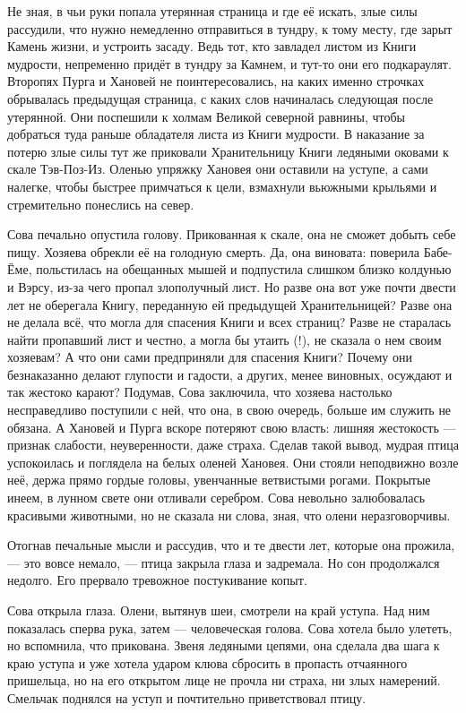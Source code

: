 \documentclass[12pt, a4paper, openany]{book}
\begin{document}
	Не зная, в чьи руки попала утерянная страница и где её искать, злые силы рассудили, что нужно немедленно отправиться в тундру, к тому месту, где зарыт Камень жизни, и устроить засаду. Ведь тот, кто завладел листом из Книги мудрости, непременно придёт в тундру за Камнем, и тут-то они его подкараулят. Второпях Пурга и Хановей не поинтересовались, на каких именно строчках обрывалась предыдущая страница, с каких слов начиналась следующая после утерянной. Они поспешили к холмам Великой северной равнины, чтобы добраться туда раньше обладателя листа из Книги мудрости. В наказание за потерю злые силы тут же приковали Хранительницу Книги ледяными оковами к скале Тэв-Поз-Из. Оленью упряжку Хановея они оставили на уступе, а сами налегке, чтобы быстрее примчаться к цели, взмахнули вьюжными крыльями и стремительно понеслись на север.
	
	Сова печально опустила голову. Прикованная к скале, она не сможет добыть себе пищу. Хозяева обрекли её на голодную смерть. Да, она виновата: поверила Бабе-Ёме, польстилась на обещанных мышей и подпустила слишком близко колдунью и Вэрсу, из-за чего пропал злополучный лист. Но разве она вот уже почти двести лет не оберегала Книгу, переданную ей предыдущей Хранительницей? Разве она не делала всё, что могла для спасения Книги и всех страниц? Разве не старалась найти пропавший лист и честно, а могла бы утаить (!), не сказала о нем своим хозяевам? А что они сами предприняли для спасения Книги? Почему они безнаказанно делают глупости и гадости, а других, менее виновных, осуждают и так жестоко карают? Подумав, Сова заключила, что хозяева настолько несправедливо поступили с ней, что она, в свою очередь, больше им служить не обязана. А Хановей и Пурга вскоре потеряют свою власть: лишняя жестокость — признак слабости, неуверенности, даже страха. Сделав такой вывод, мудрая птица успокоилась и поглядела на белых оленей Хановея. Они стояли неподвижно возле неё, держа прямо гордые головы, увенчанные ветвистыми рогами. Покрытые инеем, в лунном свете они отливали серебром. Сова невольно залюбовалась красивыми животными, но не сказала ни слова, зная, что олени неразговорчивы.
	
	Отогнав печальные мысли и рассудив, что и те двести лет, которые она прожила, — это вовсе немало, — птица закрыла глаза и задремала. Но сон продолжался недолго. Его прервало тревожное постукивание копыт.
	
	Сова открыла глаза. Олени, вытянув шеи, смотрели на край уступа. Над ним показалась сперва рука, затем — человеческая голова. Сова хотела было улететь, но вспомнила, что прикована. Звеня ледяными цепями, она сделала два шага к краю уступа и уже хотела ударом клюва сбросить в пропасть отчаянного пришельца, но на его открытом лице не прочла ни страха, ни злых намерений. Смельчак поднялся на уступ и почтительно приветствовал птицу.
	
\end{document}
